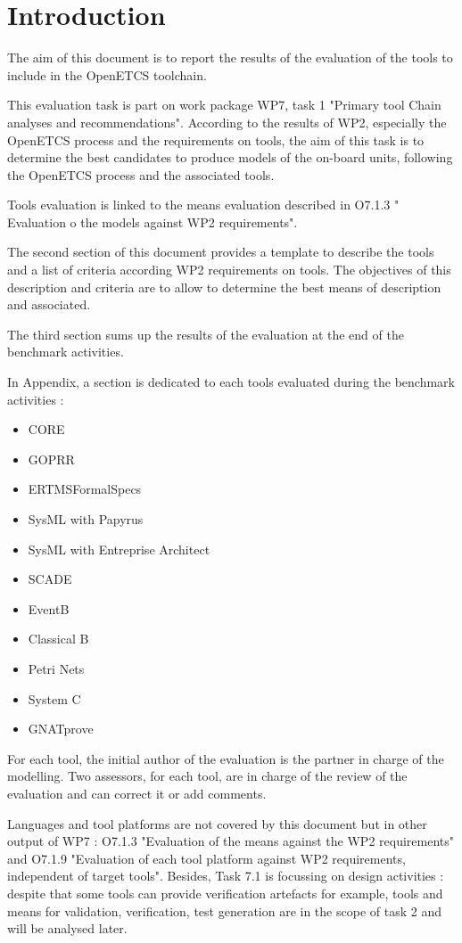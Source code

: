 

\chapter{Introduction}


The aim of this document is to report the results of the evaluation of the tools to include in the OpenETCS toolchain.

This evaluation task is part on work package WP7, task 1  "Primary tool Chain analyses and recommendations". According to the results of WP2, especially the OpenETCS process and the requirements on tools, the aim of this task is to determine the best candidates to  produce models of the on-board units, following the OpenETCS process and the associated tools.

Tools evaluation is linked to the means evaluation described in O7.1.3 " Evaluation o the models against WP2 requirements".


The second section of this document provides a template to describe the tools and a list of criteria according WP2 requirements on tools. The objectives of this description and criteria are to allow to determine the best means of description and associated.

The third section sums up the results of the evaluation at the end of the benchmark activities.

In Appendix, a section is dedicated to each tools evaluated during the benchmark activities :
\begin{itemize}
\item  CORE
\item  GOPRR
\item  ERTMSFormalSpecs
\item  SysML with Papyrus
\item  SysML with Entreprise Architect
\item  SCADE
\item  EventB 
\item  Classical B 
\item  Petri Nets
\item  System C
\item  GNATprove
\end{itemize}

For each tool, the initial  author of the evaluation is the partner in charge of the modelling. Two assessors, for each tool,  are in charge of the review of the evaluation and can correct it or add comments.

Languages and tool platforms are not covered by this document but in other output of WP7 : O7.1.3  "Evaluation of the means against the WP2 requirements" and O7.1.9 "Evaluation of each tool platform against WP2 requirements, independent of target tools".
Besides, Task 7.1 is focussing on design activities : despite that some tools can provide verification artefacts for example,  tools and means for validation, verification, test generation are in the scope of task 2 and will be analysed later.